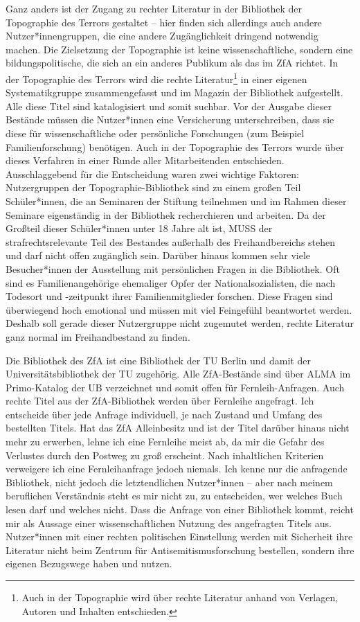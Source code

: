 \documentclass[a4paper,
fontsize=11pt,
oneside,
numbers=noperiodatend,
parskip=half-,
bibliography=totoc,
final
]{scrartcl}
\begin{document}
Ganz anders ist der Zugang zu rechter Literatur in der Bibliothek der
Topographie des Terrors gestaltet -- hier finden sich allerdings auch
andere Nutzer*innengruppen, die eine andere Zugänglichkeit dringend
notwendig machen. Die Zielsetzung der Topographie ist keine
wissenschaftliche, sondern eine bildungspolitische, die sich an ein
anderes Publikum als das im ZfA richtet. In der Topographie des Terrors
wird die rechte Literatur\footnote{Auch in der Topographie wird über
  rechte Literatur anhand von Verlagen, Autoren und Inhalten
  entschieden.} in einer eigenen Systematikgruppe zusammengefasst und im
Magazin der Bibliothek aufgestellt. Alle diese Titel sind katalogisiert
und somit suchbar. Vor der Ausgabe dieser Bestände müssen die
Nutzer*innen eine Versicherung unterschreiben, dass sie diese für
wissenschaftliche oder persönliche Forschungen (zum Beispiel
Familienforschung) benötigen. Auch in der Topographie des Terrors wurde
über dieses Verfahren in einer Runde aller Mitarbeitenden entschieden.
Ausschlaggebend für die Entscheidung waren zwei wichtige Faktoren:
Nutzergruppen der Topographie-Bibliothek sind zu einem großen Teil
Schüler*innen, die an Seminaren der Stiftung teilnehmen und im Rahmen
dieser Seminare eigenständig in der Bibliothek recherchieren und
arbeiten. Da der Großteil dieser Schüler*innen unter 18 Jahre alt ist,
MUSS der strafrechtsrelevante Teil des Bestandes außerhalb des
Freihandbereichs stehen und darf nicht offen zugänglich sein. Darüber
hinaus kommen sehr viele Besucher*innen der Ausstellung mit persönlichen
Fragen in die Bibliothek. Oft sind es Familienangehörige ehemaliger
Opfer der Nationalsozialisten, die nach Todesort und -zeitpunkt ihrer
Familienmitglieder forschen. Diese Fragen sind überwiegend hoch
emotional und müssen mit viel Feingefühl beantwortet werden. Deshalb
soll gerade dieser Nutzergruppe nicht zugemutet werden, rechte Literatur
ganz normal im Freihandbestand zu finden.

Die Bibliothek des ZfA ist eine Bibliothek der TU Berlin und damit der
Universitätsbibliothek der TU zugehörig. Alle ZfA-Bestände sind über
ALMA im Primo-Katalog der UB verzeichnet und somit offen für
Fernleih-Anfragen. Auch rechte Titel aus der ZfA-Bibliothek werden über
Fernleihe angefragt. Ich entscheide über jede Anfrage individuell, je
nach Zustand und Umfang des bestellten Titels. Hat das ZfA Alleinbesitz
und ist der Titel darüber hinaus nicht mehr zu erwerben, lehne ich eine
Fernleihe meist ab, da mir die Gefahr des Verlustes durch den Postweg zu
groß erscheint. Nach inhaltlichen Kriterien verweigere ich eine
Fernleihanfrage jedoch niemals. Ich kenne nur die anfragende Bibliothek,
nicht jedoch die letztendlichen Nutzer*innen -- aber nach meinem
beruflichen Verständnis steht es mir nicht zu, zu entscheiden, wer
welches Buch lesen darf und welches nicht. Dass die Anfrage von einer
Bibliothek kommt, reicht mir als Aussage einer wissenschaftlichen
Nutzung des angefragten Titels aus. Nutzer*innen mit einer rechten
politischen Einstellung werden mit Sicherheit ihre Literatur nicht beim
Zentrum für Antisemitismusforschung bestellen, sondern ihre eigenen
Bezugswege haben und nutzen.
\end{document}

